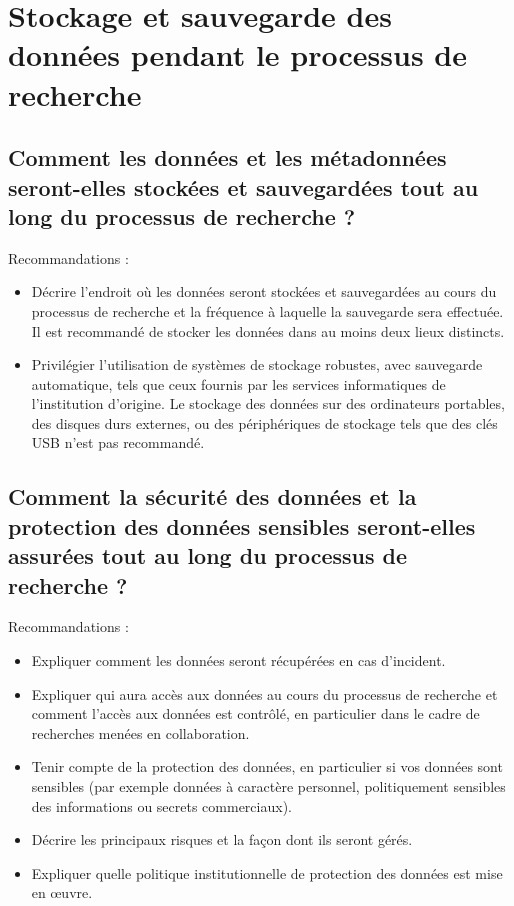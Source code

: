 \documentclass{article}
\begin{document}
\section{Stockage et sauvegarde des données pendant le processus de recherche}
\subsection{Comment les données et les métadonnées seront-elles stockées et sauvegardées tout au long du processus de recherche ?}
Recommandations :
\begin{itemize}
    \item Décrire l'endroit où les données seront stockées et sauvegardées au cours du processus de recherche et la fréquence à laquelle la sauvegarde sera effectuée. Il est recommandé de stocker les données dans au moins deux lieux distincts.
    \item Privilégier l'utilisation de systèmes de stockage robustes, avec sauvegarde automatique, tels que ceux fournis par les services informatiques de l'institution d'origine. Le stockage des données sur des ordinateurs portables, des disques durs externes, ou des périphériques de stockage tels que des clés USB n'est pas recommandé.
\end{itemize}

\subsection{Comment la sécurité des données et la protection des données sensibles seront-elles assurées tout au long du processus de recherche ?}
Recommandations :
\begin{itemize}
    \item Expliquer comment les données seront récupérées en cas d'incident.
    \item Expliquer qui aura accès aux données au cours du processus de recherche et comment l'accès aux données est contrôlé, en particulier dans le cadre de recherches menées en collaboration.
    \item Tenir compte de la protection des données, en particulier si vos données sont sensibles (par exemple données à caractère personnel, politiquement sensibles des informations ou secrets commerciaux).
    \item Décrire les principaux risques et la façon dont ils seront gérés.
    \item Expliquer quelle politique institutionnelle de protection des données est mise en œuvre.
\end{itemize}
\end{document}
